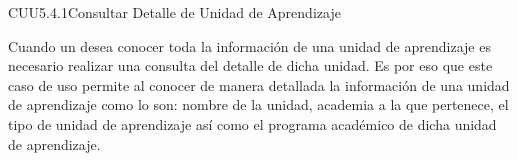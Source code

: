\begin{UseCase}{CUU5.4.1}{Consultar Detalle de Unidad de Aprendizaje}
	{
		Cuando un  desea conocer toda la información de una unidad de aprendizaje es necesario realizar una consulta del detalle de dicha unidad. Es por eso que este caso de uso permite al  conocer de manera detallada  la información de una unidad de aprendizaje como lo son: nombre de la unidad, academia a la que pertenece, el tipo de unidad de aprendizaje así como el programa académico de dicha unidad de aprendizaje. 
			
		}
		
		
		

\end{UseCase}
